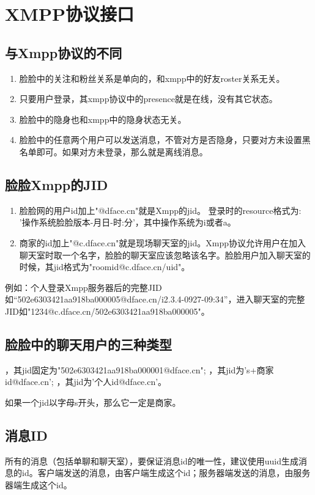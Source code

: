 \section{XMPP协议接口}


\subsection{与Xmpp协议的不同}

\begin{enumerate}
\item 脸脸中的关注和粉丝关系是单向的，和xmpp中的好友roster关系无关。
\item 只要用户登录，其xmpp协议中的presence就是在线，没有其它状态。
\item 脸脸中的隐身也和xmpp中的隐身状态无关。
\item 脸脸中的任意两个用户可以发送消息，不管对方是否隐身，只要对方未设置黑名单即可。如果对方未登录，那么就是离线消息。
\end{enumerate}

\subsection{脸脸Xmpp的JID}
\begin{enumerate}
\item 脸脸网的用户id加上"@dface.cn"就是Xmpp的jid。
登录时的resource格式为: '操作系统脸脸版本-月日-时:分'，其中操作系统为i或者a。
\item 商家的id加上"@c.dface.cn"就是现场聊天室的jid。Xmpp协议允许用户在加入聊天室时取一个名字，脸脸的聊天室应该忽略该名字。脸脸用户加入聊天室的时候，其jid格式为"roomid@c.dface.cn/uid"。
\end{enumerate}
例如：个人登录Xmpp服务器后的完整JID如“502e6303421aa918ba000005@dface.cn/i2.3.4-0927-09:34”，进入聊天室的完整JID如"1234@c.dface.cn/502e6303421aa918ba000005"。


\subsection{脸脸中的聊天用户的三种类型}

\begin{enumerate}
，其jid固定为"502e6303421aa918ba000001@dface.cn";
，其jid为's+商家id@dface.cn';
，其jid为'个人id@dface.cn'。
\end{enumerate}
如果一个jid以字母s开头，那么它一定是商家。




\subsection{消息ID}
所有的消息（包括单聊和聊天室），要保证消息id的唯一性，建议使用uuid生成消息的id。客户端发送的消息，由客户端生成这个id；服务器端发送的消息，由服务器端生成这个id。

